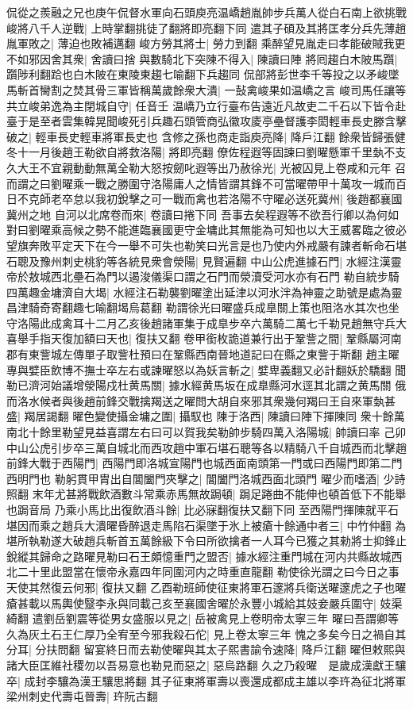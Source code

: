 侃從之羨融之兄也庚午侃督水軍向石頭庾亮温嶠趙胤帥步兵萬人從白石南上欲挑戰峻將八千人逆戰|{
	上時掌翻挑徒了翻將即亮翻下同}
遣其子碩及其將匡孝分兵先薄趙胤軍敗之|{
	薄迫也敗補邁翻}
峻方勞其將士|{
	勞力到翻}
乘醉望見胤走曰孝能破賊我更不如邪因舍其衆|{
	舍讀曰捨}
與數騎北下突陳不得入|{
	陳讀曰陣}
將囘趨白木陂馬躓|{
	躓陟利翻跲也白木陂在東陵東趨七喻翻下兵趨同}
侃部將彭世李千等投之以矛峻墜馬斬首臠割之焚其骨三軍皆稱萬歲餘衆大潰|{
	一鼔禽峻果如温嶠之言}
峻司馬任讓等共立峻弟逸為主閉城自守|{
	任音壬}
温嶠乃立行臺布告遠近凡故吏二千石以下皆令赴臺于是至者雲集韓晃聞峻死引兵趣石頭管商弘徽攻庱亭壘督護李閎輕車長史滕含擊破之|{
	輕車長史輕車將軍長史也}
含修之孫也商走詣庾亮降|{
	降戶江翻}
餘衆皆歸張健　冬十一月後趙王勒欲自將救洛陽|{
	將即亮翻}
僚佐程遐等固諫曰劉曜懸軍千里埶不支久大王不宜親動動無萬全勒大怒按劒叱遐等出乃赦徐光|{
	光被囚見上卷咸和元年}
召而謂之曰劉曜乘一戰之勝圍守洛陽庸人之情皆謂其鋒不可當曜帶甲十萬攻一城而百日不克師老卒怠以我初銳擊之可一戰而禽也若洛陽不守曜必送死冀州|{
	後趙都襄國冀州之地}
自河以北席卷而來|{
	卷讀曰捲下同}
吾事去矣程遐等不欲吾行卿以為何如對曰劉曜乘高候之勢不能進臨襄國更守金墉此其無能為可知也以大王威畧臨之彼必望旗奔敗平定天下在今一舉不可失也勒笑曰光言是也乃使内外戒嚴有諫者斬命石堪石聰及豫州刺史桃豹等各統見衆會滎陽|{
	見賢遍翻}
中山公虎進據石門|{
	水經注漢靈帝於敖城西北壘石為門以遏浚儀渠口謂之石門而滎瀆受河水亦有石門}
勒自統步騎四萬趣金墉濟自大堨|{
	水經注石勒襲劉曜塗出延津以河氷泮為神靈之助號是處為靈昌津騎奇寄翻趣七喻翻堨烏葛翻}
勒謂徐光曰曜盛兵成臯關上策也阻洛水其次也坐守洛陽此成禽耳十二月乙亥後趙諸軍集于成臯步卒六萬騎二萬七千勒見趙無守兵大喜舉手指天復加額曰天也|{
	復扶又翻}
卷甲銜枚詭道兼行出于鞏訾之間|{
	鞏縣屬河南郡有東訾城左傳單子取訾杜預曰在鞏縣西南晉地道記曰在縣之東訾于斯翻}
趙主曜專與嬖臣飲博不撫士卒左右或諫曜怒以為妖言斬之|{
	嬖卑義翻又必計翻妖於驕翻}
聞勒已濟河始議增滎陽戍杜黄馬關|{
	據水經黄馬坂在成臯縣河水逕其北謂之黄馬關}
俄而洛水候者與後趙前鋒交戰擒羯送之曜問大胡自來邪其衆幾何羯曰王自來軍埶甚盛|{
	羯居謁翻}
曜色變使攝金墉之圍|{
	攝馭也}
陳于洛西|{
	陳讀曰陣下揮陳同}
衆十餘萬南北十餘里勒望見益喜謂左右曰可以賀我矣勒帥步騎四萬入洛陽城|{
	帥讀曰率}
己卯中山公虎引步卒三萬自城北而西攻趙中軍石堪石聰等各以精騎八千自城西而北擊趙前鋒大戰于西陽門|{
	西陽門即洛城宣陽門也城西面南頭第一門或曰西陽門即第二門西明門也}
勒躬貫甲胄出自閶闔門夾擊之|{
	閶闔門洛城西面北頭門}
曜少而嗜酒|{
	少詩照翻}
末年尤甚將戰飲酒數斗常乘赤馬無故跼頓|{
	跼足踡曲不能伸也頓首低下不能舉也跼音局}
乃乘小馬比出復飲酒斗餘|{
	比必寐翻復扶又翻下同}
至西陽門揮陳就平石堪因而乘之趙兵大潰曜昏醉退走馬陷石渠墜于氷上被瘡十餘通中者三|{
	中竹仲翻}
為堪所執勒遂大破趙兵斬首五萬餘級下令曰所欲擒者一人耳今已獲之其勑將士抑鋒止銳縱其歸命之路曜見勒曰石王頗憶重門之盟否|{
	據水經注重門城在河内共縣故城西北二十里此盟當在懷帝永嘉四年同圍河内之時重直龍翻}
勒使徐光謂之曰今日之事天使其然復云何邪|{
	復扶又翻}
乙酉勒班師使征東將軍石邃將兵衛送曜邃虎之子也曜瘡甚載以馬輿使毉李永與同載己亥至襄國舍曜於永豐小城給其妓妾嚴兵圍守|{
	妓渠綺翻}
遣劉岳劉震等從男女盛服以見之|{
	岳被禽見上卷明帝太寧三年}
曜曰吾謂卿等久為灰土石王仁厚乃全宥至今邪我殺石佗|{
	見上卷太寧三年}
愧之多矣今日之禍自其分耳|{
	分扶問翻}
留宴終日而去勒使曜與其太子熙書諭令速降|{
	降戶江翻}
曜但敕熙與諸大臣匡維社稷勿以吾易意也勒見而惡之|{
	惡烏路翻}
久之乃殺曜　是歲成漢獻王驤卒|{
	成封李驤為漢王驤思將翻}
其子征東將軍壽以喪還成都成主雄以李玝為征北將軍梁州刺史代壽屯晉壽|{
	玝阮古翻}


